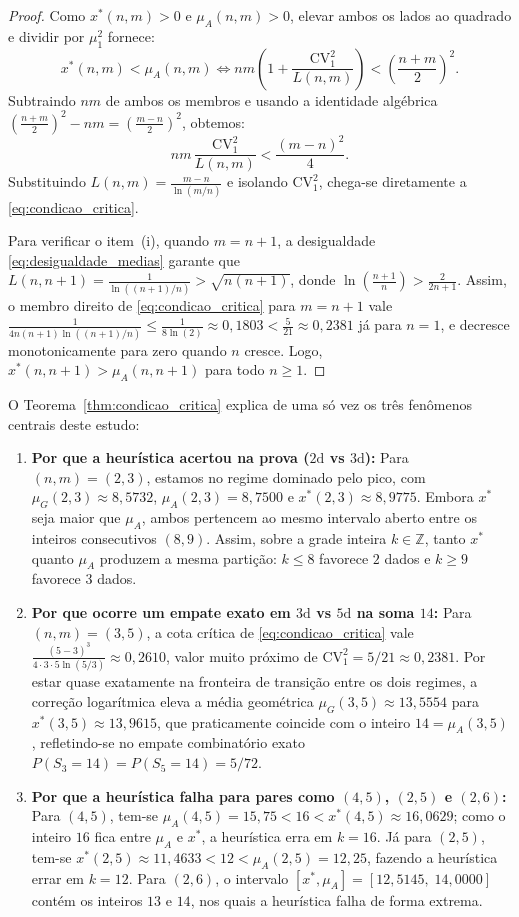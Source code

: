 \documentclass[11pt,a4paper]{article}
\theoremstyle{definition}
\theoremstyle{remark}
\begin{document}
\begin{proof}
Como $x^*(n,m) > 0$ e $\mu_A(n,m) > 0$, elevar ambos os lados ao quadrado e dividir por $\mu_1^2$ fornece:
\[
x^*(n, m) < \mu_A(n, m)
\iff
nm\left(1 + \frac{\mathrm{CV}_1^2}{L(n, m)}\right) < \left(\frac{n + m}{2}\right)^2.
\]
Subtraindo $nm$ de ambos os membros e usando a identidade algébrica $\left(\frac{n+m}{2}\right)^2 - nm = \left(\frac{m-n}{2}\right)^2$, obtemos:
\[
nm \, \frac{\mathrm{CV}_1^2}{L(n, m)} < \frac{(m - n)^2}{4}.
\]
Substituindo $L(n,m) = \frac{m-n}{\ln(m/n)}$ e isolando $\mathrm{CV}_1^2$, chega-se diretamente a \eqref{eq:condicao_critica}.

Para verificar o item~(i), quando $m = n + 1$, a desigualdade \eqref{eq:desigualdade_medias} garante que $L(n, n+1) = \frac{1}{\ln((n+1)/n)} > \sqrt{n(n+1)}$, donde $\ln\!\left(\frac{n+1}{n}\right) > \frac{2}{2n+1}$. Assim, o membro direito de \eqref{eq:condicao_critica} para $m = n + 1$ vale $\frac{1}{4n(n+1)\ln((n+1)/n)} \le \frac{1}{8\ln(2)} \approx 0{,}1803 < \frac{5}{21} \approx 0{,}2381$ já para $n = 1$, e decresce monotonicamente para zero quando $n$ cresce. Logo, $x^*(n, n+1) > \mu_A(n, n+1)$ para todo $n \ge 1$.
\end{proof}

O Teorema~\ref{thm:condicao_critica} explica de uma só vez os três fenômenos centrais deste estudo:
\begin{enumerate}[topsep=0.2em, itemsep=0.2em]
    \item \textbf{Por que a heurística acertou na prova ($2\text{d}$ vs $3\text{d}$):} Para $(n,m) = (2,3)$, estamos no regime dominado pelo pico, com $\mu_G(2,3) \approx 8{,}5732$, $\mu_A(2,3) = 8{,}7500$ e $x^*(2,3) \approx 8{,}9775$. Embora $x^*$ seja maior que $\mu_A$, ambos pertencem ao mesmo intervalo aberto entre os inteiros consecutivos $(8, 9)$. Assim, sobre a grade inteira $k \in \mathbb{Z}$, tanto $x^*$ quanto $\mu_A$ produzem a mesma partição: $k \le 8$ favorece $2$ dados e $k \ge 9$ favorece $3$ dados.
    \item \textbf{Por que ocorre um empate exato em $3\text{d}$ vs $5\text{d}$ na soma $14$:} Para $(n,m) = (3,5)$, a cota crítica de \eqref{eq:condicao_critica} vale $\frac{(5-3)^3}{4 \cdot 3 \cdot 5 \ln(5/3)} \approx 0{,}2610$, valor muito próximo de $\mathrm{CV}_1^2 = 5/21 \approx 0{,}2381$. Por estar quase exatamente na fronteira de transição entre os dois regimes, a correção logarítmica eleva a média geométrica $\mu_G(3,5) \approx 13{,}5554$ para $x^*(3,5) \approx 13{,}9615$, que praticamente coincide com o inteiro $14 = \mu_A(3,5)$, refletindo-se no empate combinatório exato $P(S_3 = 14) = P(S_5 = 14) = 5/72$.
    \item \textbf{Por que a heurística falha para pares como $(4,5)$, $(2,5)$ e $(2,6)$:} Para $(4,5)$, tem-se $\mu_A(4,5) = 15{,}75 < 16 < x^*(4,5) \approx 16{,}0629$; como o inteiro $16$ fica entre $\mu_A$ e $x^*$, a heurística erra em $k = 16$. Já para $(2,5)$, tem-se $x^*(2,5) \approx 11{,}4633 < 12 < \mu_A(2,5) = 12{,}25$, fazendo a heurística errar em $k = 12$. Para $(2,6)$, o intervalo $[x^*, \mu_A] = [12{,}5145,\; 14{,}0000]$ contém os inteiros $13$ e $14$, nos quais a heurística falha de forma extrema.
\end{enumerate}
\end{document}
